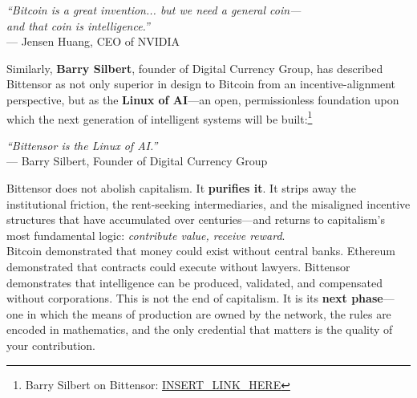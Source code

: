 \documentclass[12pt, a4paper, oneside]{report}
\theoremstyle{definition}
\begin{document}
\begin{center}
\textit{``Bitcoin is a great invention... but we need a general coin—}\\
\textit{and that coin is intelligence.''}\\
\smallskip
{\small — Jensen Huang, CEO of NVIDIA}
\end{center}

\vspace{0.4cm}

Similarly, \textbf{Barry Silbert}, founder of Digital Currency Group, has 
described Bittensor as not only superior in design to Bitcoin from an 
incentive-alignment perspective, but as the \textbf{Linux of AI}—an open, 
permissionless foundation upon which the next generation of intelligent 
systems will be built:\footnote{Barry Silbert on Bittensor: 
\url{INSERT_LINK_HERE}}\\[0.4cm]

\begin{center}
\textit{``Bittensor is the Linux of AI.''}\\
\smallskip
{\small — Barry Silbert, Founder of Digital Currency Group}
\end{center}

\vspace{0.4cm}

Bittensor does not abolish capitalism. It \textbf{purifies it}. It strips 
away the institutional friction, the rent-seeking intermediaries, and the 
misaligned incentive structures that have accumulated over centuries—and 
returns to capitalism's most fundamental logic: \emph{contribute value, 
receive reward}.\\[0.4cm]

Bitcoin demonstrated that money could exist without central banks. Ethereum 
demonstrated that contracts could execute without lawyers. Bittensor 
demonstrates that intelligence can be produced, validated, and compensated 
without corporations. This is not the end of capitalism. It is its 
\textbf{next phase}—one in which the means of production are owned by the 
network, the rules are encoded in mathematics, and the only credential 
that matters is the quality of your contribution.





\end{document}
